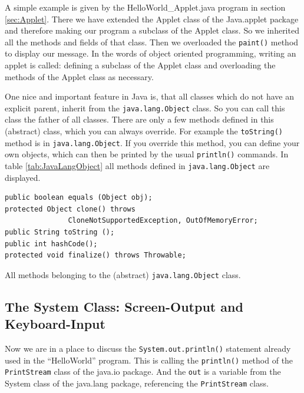 A simple example is given by the
HelloWorld\_Applet.java program in section \ref{sec:Applet}.
There we have extended the Applet class of the Java.applet package
and therefore making our program a subclass of the Applet class.
So we inherited all the methods and fields of that class. Then we
overloaded the \verb|paint()| method to display our message. 
In the words of object oriented programming, writing an applet is
called: defining a subclass of the Applet class and overloading
the methods of the Applet class as necessary.

One nice and important feature in Java is, that all classes which
do not have an explicit parent, inherit from the \verb|java.lang.Object| 
class. So you can call this class the father of all classes.
There are only a few methods defined in this (abstract) class,
which you can always override. For example the \verb|toString()| 
method is in \verb|java.lang.Object|. If you override this method,
you can define your own objects, which can then be printed by
the usual \verb|println()| commands. In table \ref{tab:JavaLangObject}
all methods defined in \verb|java.lang.Object| are displayed.
\begin{table}[htbp]
  \begin{center}
\begin{small}
\begin{verbatim}
public boolean equals (Object obj);
protected Object clone() throws 
               CloneNotSupportedException, OutOfMemoryError;
public String toString ();
public int hashCode(); 
protected void finalize() throws Throwable;
\end{verbatim}
\end{small}
    \caption{All methods belonging to the (abstract) 
               \texttt{java.lang.Object} class.}
    \label{tab:JavaLangObject}
  \end{center}
\end{table}

\subsection{The System Class: Screen-Output and Keyboard-Input}

Now we are in a place to discuss the \verb|System.out.println()| statement
already used in the ``HelloWorld'' program. This is calling the
\verb|println()| method of the \verb|PrintStream| class of the java.io 
package. And the \verb|out| is a variable from the System 
class of the java.lang package, referencing the \verb|PrintStream| class. 

